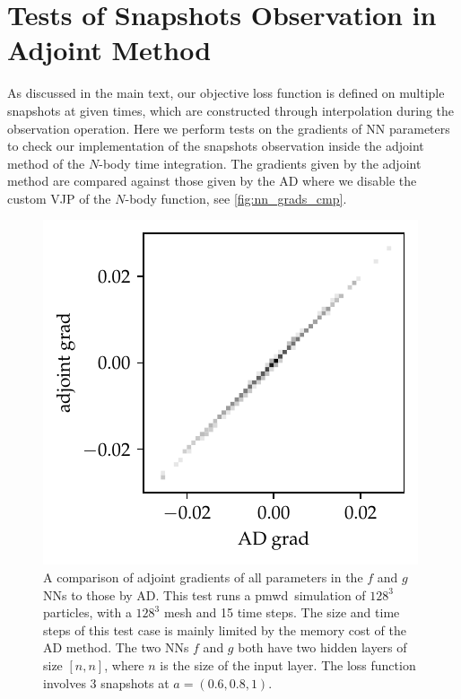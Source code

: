 \documentclass[modern, trackchanges, dvipsnames]{aastex631}
\newcommand{\pmwd}{{\usefont{T1}{nova}{m}{sl}pmwd}}
\begin{document}




\vspace{1em}
\appendix


\vspace{1em}
\section{Tests of Snapshots Observation in Adjoint Method}
As discussed in the main text, our objective loss function is defined on
multiple snapshots at given times, which are constructed through
interpolation during the observation operation.
Here we perform tests on the gradients of NN parameters to check our
implementation of the snapshots observation inside the adjoint method of
the $N$-body time integration.
The gradients given by the adjoint method are compared against those
given by the AD where we disable the custom VJP of the $N$-body
function, see
\autoref{fig:nn_grads_cmp}.

\begin{figure}
  \centering
  \includegraphics[width=0.5\linewidth]{nn_grads_cmp.pdf}
  \caption{A comparison of adjoint gradients of all parameters in the
  $f$ and $g$ NNs to those by AD.
  This test runs a \pmwd\ simulation of $128^3$ particles, with a
  $128^3$ mesh and 15 time steps.
  The size and time steps of this test case is mainly limited by the
  memory cost of the AD method.
  The two NNs $f$ and $g$ both have two hidden layers of size $[n, n]$,
  where $n$ is the size of the input layer.
  The loss function involves 3 snapshots at $a=(0.6, 0.8, 1)$.
  }
  \label{fig:nn_grads_cmp}
\end{figure}


\end{document}
